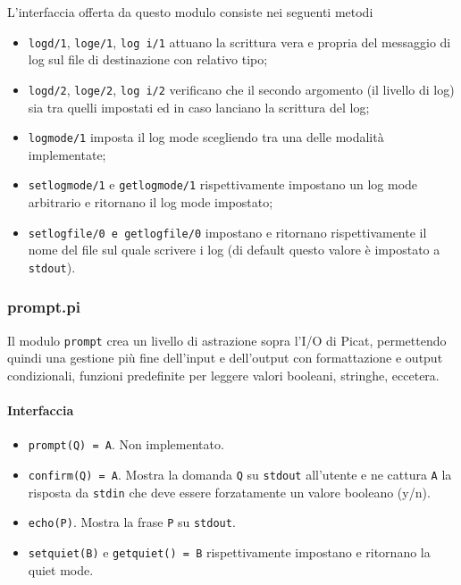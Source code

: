 \documentclass[12pt,a4paper,openright]{book} %
\begin{document}
L'interfaccia offerta da questo modulo consiste nei seguenti metodi
\begin{itemize}
	\item \texttt{log\textunderscore d/1},
          \texttt{log\textunderscore e/1}, \texttt{log\textunderscore
            i/1} attuano la scrittura vera e propria del messaggio di
          log sul file di destinazione con relativo tipo;
	\item \texttt{log\textunderscore d/2},
          \texttt{log\textunderscore e/2}, \texttt{log\textunderscore
            i/2} verificano che il secondo argomento (il livello di
          log) sia tra quelli impostati ed in caso lanciano la
          scrittura del log;
	\item \texttt{log\textunderscore mode/1} imposta il log mode
          scegliendo tra una delle modalità implementate;
	\item \texttt{set\textunderscore log\textunderscore mode/1} e
          \texttt{get\textunderscore log\textunderscore mode/1}
          rispettivamente impostano un log mode arbitrario e ritornano
          il log mode impostato;
	\item \texttt{set\textunderscore log\textunderscore file/0 e
          get\textunderscore log\textunderscore file/0} impostano e
          ritornano rispettivamente il nome del file sul quale
          scrivere i log (di default questo valore è impostato a
          \texttt{stdout}).
\end{itemize}

\subsubsection{prompt.pi}

Il modulo \texttt{prompt} crea un livello di astrazione sopra l'I/O di
Picat, permettendo quindi una gestione più fine dell'input e
dell'output con formattazione e output condizionali, funzioni
predefinite per leggere valori booleani, stringhe, eccetera.

\paragraph{Interfaccia}

\begin{itemize}
	\item \texttt{prompt(Q) = A}. Non implementato.
	\item \texttt{confirm(Q) = A}. Mostra la domanda \texttt{Q} su
          \texttt{stdout} all'utente e ne cattura \texttt{A} la
          risposta da \texttt{stdin} che deve essere forzatamente un
          valore booleano (y/n).
	\item \texttt{echo(P)}. Mostra la frase \texttt{P} su
          \texttt{stdout}.
	\item \texttt{set\textunderscore quiet(B)} e
          \texttt{get\textunderscore quiet() = B} rispettivamente
          impostano e ritornano la quiet mode.
\end{itemize}
\end{document}
